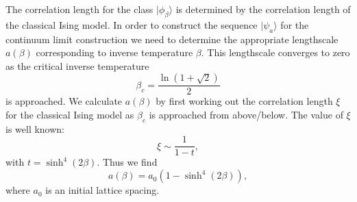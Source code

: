 \documentclass[prl,twocolumn,lengthcheck,superscriptaddress]{revtex4-1}
\theoremstyle{definition}
\theoremstyle{remark}
\begin{document}
The correlation length for the class $|\phi_\beta\rangle$ is determined by the correlation length of the classical Ising model. In order to construct the sequence $|\psi_a\rangle$ for the continuum limit construction we need to determine the appropriate lengthscale $a(\beta)$ corresponding to inverse temperature $\beta$. This lengthscale converges to zero as the critical inverse temperature 
\begin{equation}
	\beta_c = \frac{\ln(1+\sqrt{2})}{2}
\end{equation}
is approached. We calculate $a(\beta)$ by first working out the correlation length $\xi$ for the classical Ising model as $\beta_c$ is approached from above/below. The value of $\xi$ is well known:
\begin{equation}
	\xi \sim \frac{1}{1-t},
\end{equation}
with $t = \sinh^4(2\beta)$. Thus we find
\begin{equation}
	a(\beta) = a_0(1-\sinh^4(2\beta)),
\end{equation}
where $a_0$ is an initial lattice spacing.
\end{document}
